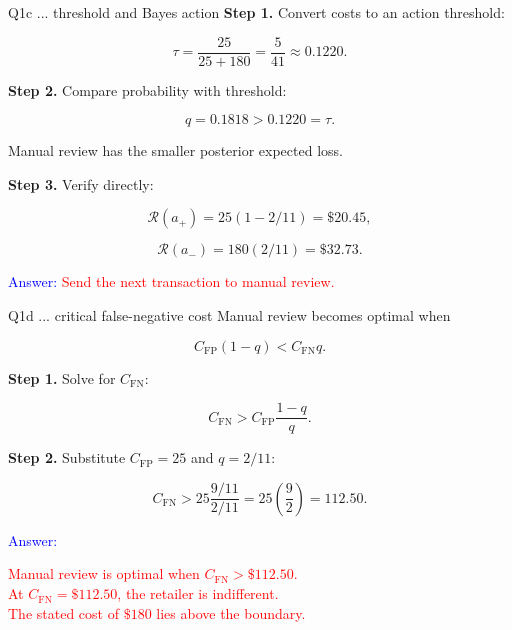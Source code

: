 \documentclass[aspectratio=43,10pt]{beamer}
\newcommand{\CFP}{C_{\mathrm{FP}}}
\newcommand{\CFN}{C_{\mathrm{FN}}}
\newcommand{\Risk}{\mathcal{R}}
\newcommand{\answer}[1]{\textcolor{red}{#1}}
\begin{document}

\begin{frame}{}
\begin{block}{Q1c ... threshold and Bayes action}
  \textbf{Step 1.} Convert costs to an action threshold:

  \[
  \tau=\frac{25}{25+180}=\frac{5}{41}\approx0.1220.
  \]
  
  \pause

  \textbf{Step 2.} Compare probability with threshold:

  \[
  q=0.1818>0.1220=\tau.
  \]

  Manual review has the smaller posterior expected loss.
  
  \pause

  \textbf{Step 3.} Verify directly:

  \[
  \Risk(a_+)=25(1-2/11)=\$20.45,
  \]

  \[
  \Risk(a_-)=180(2/11)=\$32.73.
  \]

  \textcolor{blue}{Answer:}
  \answer{Send the next transaction to manual review.}
\end{block}
\end{frame}


\begin{frame}{}
\begin{block}{Q1d ... critical false-negative cost}
  Manual review becomes optimal when

  \[
  \CFP(1-q)<\CFN q.
  \]
  
  \pause

  \textbf{Step 1.} Solve for $\CFN$:

  \[
  \CFN>\CFP\frac{1-q}{q}.
  \]
  
  \pause
  
  \textbf{Step 2.} Substitute $\CFP=25$ and $q=2/11$:

  \[
  \CFN>25\frac{9/11}{2/11}
  =25\left(\frac{9}{2}\right)
  =112.50.
  \]

  \textcolor{blue}{Answer:}

  \answer{
    Manual review is optimal when $\CFN>\$112.50$.\\
    At $\CFN=\$112.50$, the retailer is indifferent.\\
    The stated cost of $\$180$ lies above the boundary.
  }
\end{block}
\end{frame}
\end{document}
